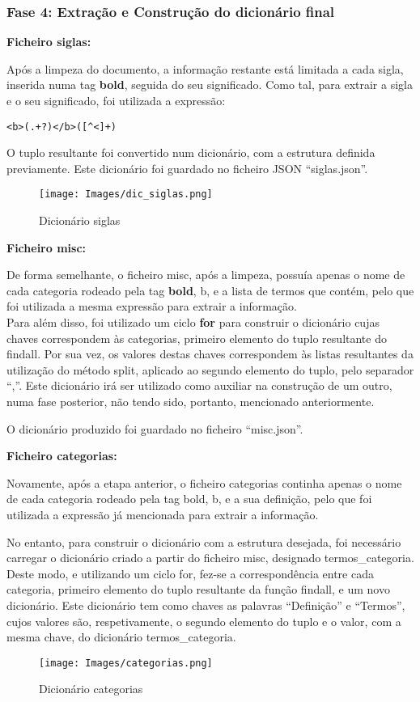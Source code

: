 \subsubsection{Fase 4: Extração e Construção do dicionário final}

\textbf{Ficheiro siglas:}

Após a limpeza do documento, a informação restante está limitada a cada sigla, inserida numa tag \textbf{bold}, seguida do seu significado. Como tal, para extrair a sigla e o seu significado, foi utilizada a expressão:
\begin{lstlisting}[style=pythonstyle]
<b>(.+?)</b>([^<]+)
\end{lstlisting}
O tuplo resultante foi convertido num dicionário, com a estrutura definida previamente.
Este dicionário foi guardado no ficheiro JSON “siglas.json”.
\begin{figure}[H]
    \centering
    \centering
    \texttt{[image: Images/dic\_siglas.png]}
    \caption{Dicionário siglas}
    \label{fig:exemplopag}
\end{figure}

\textbf{Ficheiro misc:}

De forma semelhante, o ficheiro misc, após a limpeza, possuía apenas o nome de cada categoria rodeado pela tag \textbf{bold}, b, e a lista de termos que contém, pelo que foi utilizada a mesma expressão para extrair a informação. \\
Para além disso, foi utilizado um ciclo \textbf{for} para construir o dicionário cujas chaves correspondem às categorias, primeiro elemento do tuplo resultante do findall. Por sua vez, os valores destas chaves correspondem às listas resultantes da utilização do método split, aplicado ao segundo elemento do tuplo, pelo separador “,”. Este dicionário irá ser utilizado como auxiliar na construção de um outro, numa fase posterior, não tendo sido, portanto, mencionado anteriormente. 

O dicionário produzido foi guardado no ficheiro “misc.json”.

\textbf{Ficheiro categorias:}

Novamente, após a etapa anterior, o ficheiro categorias continha apenas o nome de cada categoria rodeado pela tag bold, b, e a sua definição, pelo que foi utilizada a expressão já mencionada para extrair a informação. 

No entanto, para construir o dicionário com a estrutura desejada, foi necessário carregar o dicionário criado a partir do ficheiro misc, designado termos\_categoria. Deste modo, e utilizando um ciclo for, fez-se a correspondência entre cada categoria, primeiro elemento do tuplo resultante da função findall, e um novo dicionário. Este dicionário tem como chaves as palavras “Definição” e “Termos”, cujos valores são, respetivamente, o segundo elemento do tuplo e o valor, com a mesma chave, do dicionário termos\_categoria. 
\begin{figure}[H]
    \centering
    \centering
    \texttt{[image: Images/categorias.png]}
    \caption{Dicionário categorias}
    \label{fig:exemplopag}
\end{figure}

